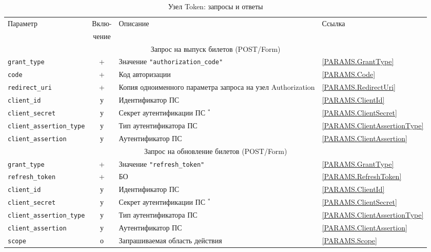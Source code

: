 \begin{table}[H]
\caption{Узел Token: запросы и ответы}\label{Table.OIDC.Token}  
\begin{tabular}{|l|c|p{8.1cm}|l|}
\hline
\multirow{2}{*}{Параметр} & Вклю- & \multirow{2}{*}{Описание} & \multirow{2}{*}{Ссылка}\\
                          & чение &&\\
\hline
\hline
\multicolumn{4}{|c|}{Запрос на выпуск билетов (POST/Form)}\\
\hline
\hline
%
\lstinline!grant_type! & + & 
Значение \lstinline!"authorization_code"! & 
\ref{PARAMS.GrantType}\\
\hline
%
\lstinline!code! & + & 
Код авторизации & 
\ref{PARAMS.Code}\\
\hline
%
\lstinline!redirect_uri! & + & 
Копия одноименного параметра запроса на узел Authorization & 
\ref{PARAMS.RedirectUri}\\
\hline
%	
\lstinline!client_id! & у & 
Идентификатор ПС & 
\ref{PARAMS.ClientId}\\
\hline
%	
\lstinline!client_secret! & у & 
Секрет аутентификации ПС$\mbox{~}^*$ & 
\ref{PARAMS.ClientSecret}\\
\hline
%
\lstinline!client_assertion_type! & у &
Тип аутентификатора ПС & 
\ref{PARAMS.ClientAssertionType}\\
\hline
%	
\lstinline!client_assertion! & у & 
Аутентификатор ПС & 
\ref{PARAMS.ClientAssertion}\\
\hline
%
\hline
\multicolumn{4}{|c|}{Запрос на обновление билетов (POST/Form)}\\
\hline
\hline
%
\lstinline!grant_type! & + & 
Значение \lstinline!"refresh_token"! & 
\ref{PARAMS.GrantType}\\
\hline
%
\lstinline!refresh_token! & + &
БО & 
\ref{PARAMS.RefreshToken}\\
\hline
%	
\lstinline!client_id! & у & 
Идентификатор ПС & 
\ref{PARAMS.ClientId}\\
\hline
%	
\lstinline!client_secret! & у & 
Секрет аутентификации ПС$\mbox{~}^*$ & 
\ref{PARAMS.ClientSecret}\\
\hline
%
\lstinline!client_assertion_type! & у &
Тип аутентификатора ПС & 
\ref{PARAMS.ClientAssertionType}\\
\hline
%	
\lstinline!client_assertion! & у & 
Аутентификатор ПС & 
\ref{PARAMS.ClientAssertion}\\
\hline
%	
\lstinline!scope! & о & 
Запрашиваемая область действия & 
\ref{PARAMS.Scope}\\

\end{tabular}
\end{table}
